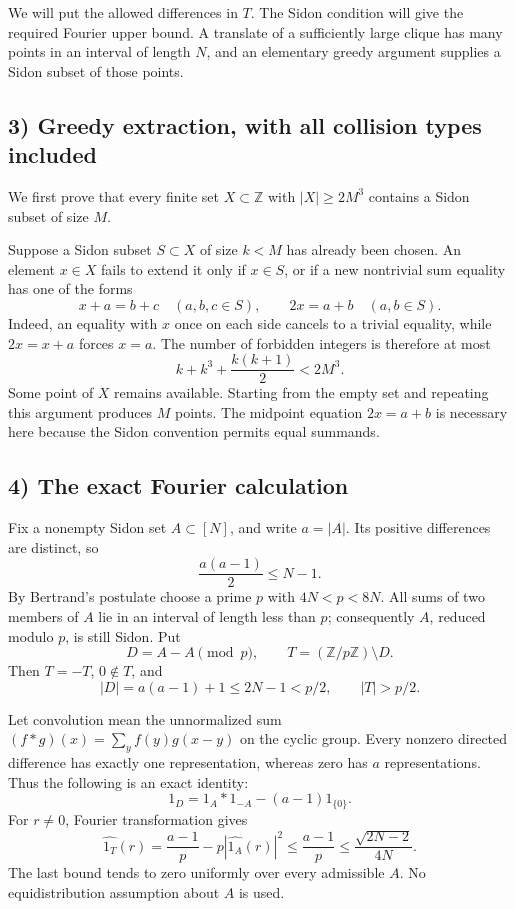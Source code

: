 We will put the allowed differences in $T$. The Sidon condition will give
the required Fourier upper bound. A translate of a sufficiently large
clique has many points in an interval of length $N$, and an elementary
greedy argument supplies a Sidon subset of those points.

\subsection{3) Greedy extraction, with all collision types included}
We first prove that every finite set $X\subset\mathbb Z$ with
$|X|\geq2M^3$ contains a Sidon subset of size $M$.

Suppose a Sidon subset $S\subset X$ of size $k<M$ has already been chosen.
An element $x\in X$ fails to extend it only if $x\in S$, or if a new
nontrivial sum equality has one of the forms
\[
 x+a=b+c\quad(a,b,c\in S),\qquad
 2x=a+b\quad(a,b\in S).
\]
Indeed, an equality with $x$ once on each side cancels to a trivial
equality, while $2x=x+a$ forces $x=a$. The number of forbidden integers
is therefore at most
\[
 k+k^3+\frac{k(k+1)}2<2M^3.
\]
Some point of $X$ remains available. Starting from the empty set and
repeating this argument produces $M$ points. The midpoint equation
$2x=a+b$ is necessary here because the Sidon convention permits equal
summands.

\subsection{4) The exact Fourier calculation}
Fix a nonempty Sidon set $A\subset[N]$, and write $a=|A|$.
Its positive differences are distinct, so
\[
 \frac{a(a-1)}2\leq N-1.
\]
By Bertrand's postulate choose a prime $p$ with $4N<p<8N$.
All sums of two members of $A$ lie in an interval of length less than $p$;
consequently $A$, reduced modulo $p$, is still Sidon. Put
\[
 D=A-A\pmod p,\qquad T=(\mathbb Z/p\mathbb Z)\setminus D.
\]
Then $T=-T$, $0\notin T$, and
\[
 |D|=a(a-1)+1\leq2N-1<p/2,
 \qquad |T|>p/2.
\]

Let convolution mean the unnormalized sum
$(f*g)(x)=\sum_y f(y)g(x-y)$ on the cyclic group. Every nonzero
directed difference has exactly one representation, whereas zero has
$a$ representations. Thus the following is an exact identity:
\[
 1_D=1_A*1_{-A}-(a-1)1_{\{0\}}.
\]
For $r\neq0$, Fourier transformation gives
\[
 \widehat{1_T}(r)
 =\frac{a-1}{p}-p\left|\widehat{1_A}(r)\right|^2
 \leq\frac{a-1}{p}
 \leq\frac{\sqrt{2N-2}}{4N}.
\]
The last bound tends to zero uniformly over every admissible $A$.
No equidistribution assumption about $A$ is used.

